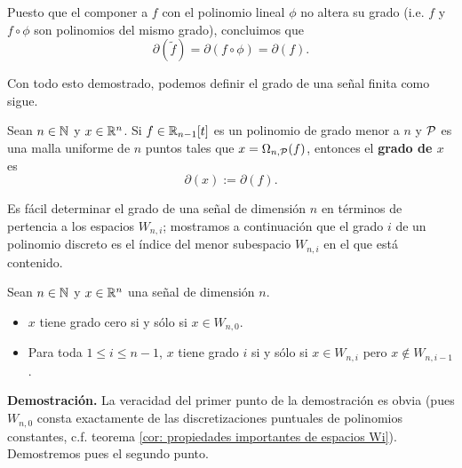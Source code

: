 Puesto que el componer a $f$ con el polinomio lineal
$\phi$ no altera su grado (i.e. $f$ y $f \circ \phi$
son polinomios del mismo grado), concluimos que
\[
\partial(\tilde{f})= \partial(f \circ \phi)=
\partial(f).
\]
\QEDB
\vspace{0.2cm}

Con todo esto demostrado, podemos definir
el grado de una señal finita como sigue.


\begin{defi}
\label{def: del grado de una senial finita}
Sean $n \in \mathbb{N}$ y $x \in \mathbb{R}^{n}$.
Si $f \in \mathbb{R}_{n-1}[t]$
es un polinomio de grado menor a $n$
y $\mathcal{P}$ es una malla uniforme
de $n$ puntos tales que
$x= \Omega_{n, \mathcal{P}}(f)$, entonces
el \textbf{grado de $x$} es 
\[
\partial(x):= \partial(f).
\]
\end{defi}

Es fácil determinar el grado de una señal 
de dimensión $n$
en términos de pertencia a los espacios $W_{n,i}$;
mostramos a continuación que
el grado $i$ de un polinomio discreto es el índice
del menor subespacio $W_{n,i}$ en el que está contenido.

\begin{prop}
\label{prop: grado de x}
Sean $n \in \mathbb{N}$ y $x \in \mathbb{R}^{n}$ una señal de dimensión $n$.
\begin{itemize}
\item $x$ tiene grado cero si y sólo si $x \in W_{n,0}$.
\item Para toda $1 \leq i \leq n-1$,
$x$ tiene
grado $i$ si y sólo si 
$x \in W_{n,i}$ pero $x \not\in W_{n,i-1}$.
\end{itemize}
\end{prop}
\noindent
\textbf{Demostración.}
La veracidad del primer punto de la demostración
es obvia (pues $W_{n,0}$ consta exactamente de las discretizaciones
puntuales de polinomios constantes, c.f. 
teorema \ref{cor: propiedades importantes de espacios Wi}).
Demostremos pues el segundo punto.

